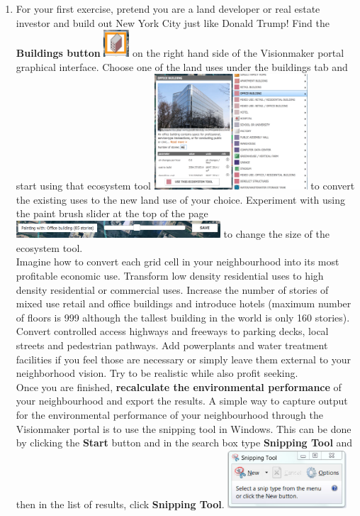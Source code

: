 \documentclass{article}
\begin{document}
\begin{enumerate}[leftmargin=15mm]
\item For your first exercise, pretend you are a land developer or real estate investor and build out New York City just like Donald Trump!  Find the \textbf{Buildings button} \includegraphics[width=0.075\textwidth]{buildings.png} on the right hand side of the Visionmaker portal graphical interface.  Choose one of the land uses under the buildings tab and start using that ecosystem tool \includegraphics[width=0.45\textwidth]{office.png} to convert the existing uses to the new land use of your choice. Experiment with using the paint brush slider at the top of the page \includegraphics[width=0.6\textwidth]{paint_slide.png} to change the size of the ecosystem tool. \\

Imagine how to convert each grid cell in your neighbourhood into its most profitable economic use.  Transform low density residential uses to high density residential or commercial uses.  Increase the number of stories of mixed use retail and office buildings and introduce hotels (maximum number of floors is 999 although the tallest building in the world is only 160 stories).   Convert controlled access highways and freeways to parking decks, local streets and pedestrian pathways.  Add powerplants and water treatment facilities if you feel those are necessary or simply leave them external to your neighborhood vision.  Try to be realistic while also profit seeking.  \\

Once you are finished, \textbf{recalculate the environmental performance} of your neighbourhood and export the results.  A simple way to capture output for the environmental performance of your neighbourhood through the Visionmaker portal is to use the snipping tool in Windows.  This can be done by clicking the \textbf{Start} button and in the search box type \textbf{Snipping Tool} and then in the list of results, click \textbf{Snipping Tool}. \includegraphics[width=0.35\textwidth]{snip_tool.png}


\end{enumerate}
\end{document}
